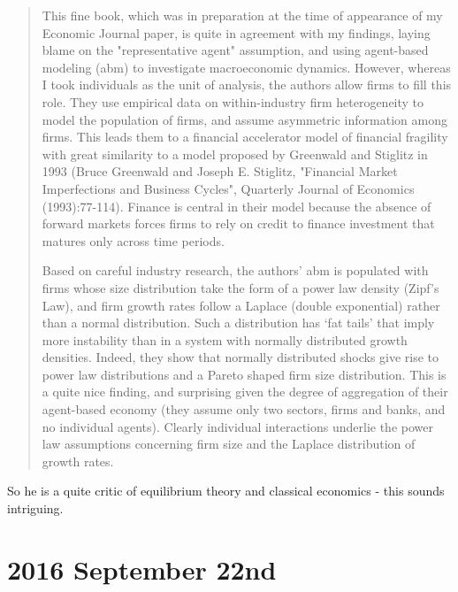 \begin{quote}
This fine book, which was in preparation at the time of appearance of my Economic Journal paper, is quite in agreement with my findings, laying blame on the "representative agent" assumption, and using agent-based modeling (abm) to investigate macroeconomic dynamics. However, whereas I took individuals as the unit of analysis, the authors allow firms to fill this role. They use empirical data on within-industry firm heterogeneity to model the population of firms, and assume asymmetric information among firms. This leads them to a financial accelerator model of financial fragility with great similarity to a model proposed by Greenwald and Stiglitz in 1993 (Bruce Greenwald and Joseph E. Stiglitz, "Financial Market Imperfections and Business Cycles", Quarterly Journal of Economics (1993):77-114). Finance is central in their model because the absence of forward markets forces firms to rely on credit to finance investment that matures only across time periods.

Based on careful industry research, the authors' abm is populated with firms whose size distribution take the form of a power law density (Zipf's Law), and firm growth rates follow a Laplace (double exponential) rather than a normal distribution. Such a distribution has `fat tails' that imply more instability than in a system with normally distributed growth densities. Indeed, they show that normally distributed shocks give rise to power law distributions and a Pareto shaped firm size distribution. This is a quite nice finding, and surprising given the degree of aggregation of their agent-based economy (they assume only two sectors, firms and banks, and no individual agents). Clearly individual interactions underlie the power law assumptions concerning firm size and the Laplace distribution of growth rates.
\end{quote}

So he is a quite critic of equilibrium theory and classical economics - this sounds intriguing. \\

\section*{2016 September 22nd}

